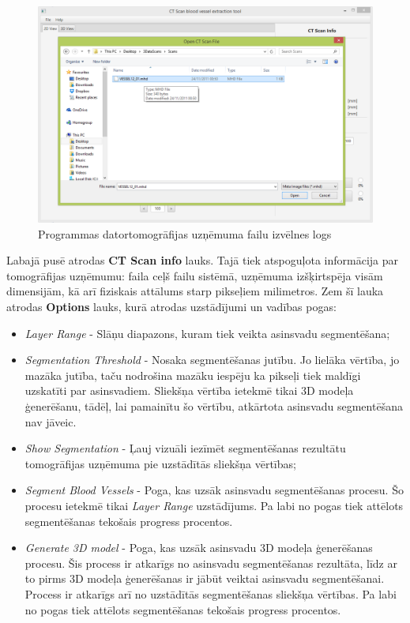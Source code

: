 \begin{figure}[h]
\begin{center}
\includegraphics[scale=0.45]{img/scan-select.png}
\caption{Programmas datortomogrāfijas uzņēmuma failu izvēlnes logs}
\label{fig:scan-select}
\end{center}
\end{figure}

Labajā pusē atrodas \textbf{CT Scan info} lauks. Tajā tiek atspoguļota informācija par tomogrāfijas uzņēmumu: faila ceļš failu sistēmā, uzņēmuma izšķirtspēja visām dimensijām, kā arī fiziskais attālums starp pikseļiem milimetros. Zem šī lauka atrodas \textbf{Options} lauks, kurā atrodas uzstādījumi un vadības pogas:
\begin{itemize}
\item \emph{Layer Range} - Slāņu diapazons, kuram tiek veikta asinsvadu segmentēšana;
\item \emph{Segmentation Threshold} - Nosaka segmentēšanas jutību. Jo lielāka vērtība, jo mazāka jutība, taču nodrošina mazāku iespēju ka pikseļi tiek maldīgi uzskatīti par asinsvadiem. Sliekšņa vērtība ietekmē tikai 3D modeļa ģenerēšanu, tādēļ, lai pamainītu šo vērtību, atkārtota asinsvadu segmentēšana nav jāveic.
\item \emph{Show Segmentation} - Ļauj vizuāli iezīmēt segmentēšanas rezultātu tomogrāfijas uzņēmuma pie uzstādītās sliekšņa vērtības;
\item \emph{Segment Blood Vessels} - Poga, kas uzsāk asinsvadu segmentēšanas procesu. Šo procesu ietekmē tikai \emph{Layer Range} uzstādījums. Pa labi no pogas tiek attēlots segmentēšanas tekošais progress procentos.

\item \emph{Generate 3D model} - Poga, kas uzsāk asinsvadu 3D modeļa ģenerēšanas procesu. Šis process ir atkarīgs no asinsvadu segmentēšanas rezultāta, līdz ar to pirms 3D modeļa ģenerēšanas ir jābūt veiktai asinsvadu segmentēšanai. Process ir atkarīgs arī no uzstādītās segmentēšanas sliekšņa vērtības. Pa labi no pogas tiek attēlots segmentēšanas tekošais progress procentos.
\end{itemize}

